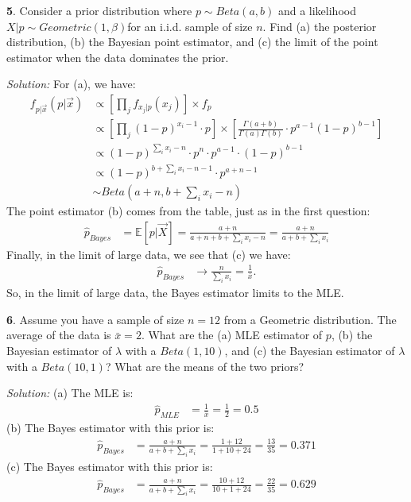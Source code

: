 \documentclass{tufte-handout}
\begin{document}
\textbf{5}. Consider a prior distribution where $p \sim Beta(a, b)$ and a 
likelihood $X|p \sim Geometric(1, \beta)$for an i.i.d. sample of size $n$.
Find (a) the posterior distribution, (b) the Bayesian point estimator, and (c) the
limit of the point estimator when the data dominates the prior.

\textit{Solution:} For (a), we have:
\begin{align*}
f_{p | \vec{x}}(p | \vec{x}) 
&\propto \left[ \prod_j f_{x_j| p }(x_j) \right] \times f_{p} \\
&\propto \left[ \prod_j (1 - p)^{x_i - 1} \cdot p \right] \times \left[ \frac{\Gamma(a + b)}{\Gamma(a)\Gamma(b)} \cdot p^{a -1} (1-p)^{b - 1} \right] \\
&\propto (1 - p)^{\sum_i x_i - n} \cdot p^{n} \cdot p^{a -1} \cdot (1-p)^{b - 1} \\
&\propto (1 - p)^{b + \sum_i x_i - n - 1} \cdot p^{a + n - 1} \\
&\sim Beta(a + n, b + \sum_i x_i - n)
\end{align*}
The point estimator (b) comes from the table, just as in the first question:
\begin{align*}
\hat{p}_{Bayes} &= \mathbb{E}[ p | \vec{X} ] = \frac{a + n}{a + n + b + \sum_i x_i - n} = \frac{a + n}{a + b + \sum_i x_i}
\end{align*}
Finally, in the limit of large data, we see that (c) we have:
\begin{align*}
\hat{p}_{Bayes} &\rightarrow \frac{n}{\sum_i x_i} = \frac{1}{\bar{x}}.
\end{align*}
So, in the limit of large data, the Bayes estimator limits to the MLE.

\textbf{6}. Assume you have a sample of size $n = 12$ from a Geometric distribution. The 
average of the data is $\bar{x} = 2$. What are the (a) MLE estimator of $p$,
(b) the Bayesian estimator of $\lambda$ with a $Beta(1, 10)$, and (c) the
Bayesian estimator of $\lambda$ with a $Beta(10, 1)$? What are the means of
the two priors?

\textit{Solution:} (a) The MLE is:
\begin{align*}
\hat{p}_{MLE} &= \frac{1}{\bar{x}} = \frac{1}{2} = 0.5
\end{align*}
(b) The Bayes estimator with this prior is:
\begin{align*}
\hat{p}_{Bayes} &= \frac{a + n}{a + b + \sum_i x_i} = \frac{1 + 12}{1 + 10 + 24} = \frac{13}{35} = 0.371
\end{align*}
(c) The Bayes estimator with this prior is:
\begin{align*}
\hat{p}_{Bayes} &= \frac{a + n}{a + b + \sum_i x_i} = \frac{10 + 12}{10 + 1 + 24} = \frac{22}{35} = 0.629
\end{align*}
\end{document}
